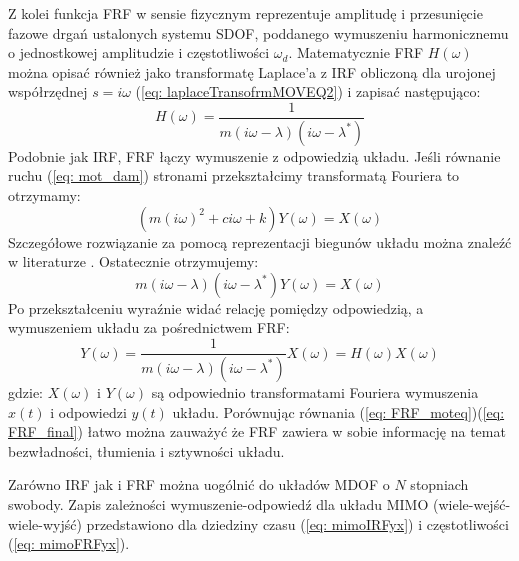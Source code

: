 Z kolei funkcja FRF w sensie fizycznym reprezentuje amplitudę i przesunięcie fazowe drgań ustalonych systemu SDOF, poddanego wymuszeniu harmonicznemu o jednostkowej amplitudzie i częstotliwości $\omega_d$. Matematycznie FRF $H(\omega)$ można opisać również jako transformatę Laplace'a z IRF obliczoną dla urojonej współrzędnej $s=i\omega$ (\ref{eq: laplaceTransofrmMOVEQ2}) i zapisać następująco:
\begin{equation} \label{eq: FRFfunction}
	H(\omega)=\frac{1}{m(i\omega-\lambda)(i\omega-\lambda^*)}
\end{equation}
Podobnie jak IRF, FRF łączy wymuszenie z odpowiedzią układu. Jeśli równanie ruchu (\ref{eq: mot_dam}) stronami przekształcimy transformatą Fouriera to otrzymamy:
\begin{equation} \label{eq: FRF_moteq}
	(m(i\omega)^2+ci\omega + k)Y(\omega)=X(\omega)
\end{equation}
Szczegółowe rozwiązanie za pomocą reprezentacji biegunów układu można znaleźć w literaturze \parencite{Brincker2015}. Ostatecznie otrzymujemy:
\begin{equation} 
	m(i\omega-\lambda)(i\omega-\lambda^*)Y(\omega)=X(\omega)
\end{equation}
Po przekształceniu wyraźnie widać relację pomiędzy odpowiedzią, a wymuszeniem układu za pośrednictwem FRF:
\begin{equation} \label{eq: FRF_final}
	Y(\omega)=\frac{1}{m(i\omega-\lambda)(i\omega-\lambda^*)}X(\omega)=H(\omega)X(\omega)
\end{equation}
gdzie: $X(\omega)$ i $Y(\omega)$ są odpowiednio transformatami Fouriera wymuszenia $x(t)$ i odpowiedzi $y(t)$ układu. Porównując równania (\ref{eq: FRF_moteq})(\ref{eq: FRF_final}) łatwo można zauważyć że FRF zawiera w sobie informację na temat bezwładności, tłumienia i sztywności układu.




Zarówno IRF jak i FRF można uogólnić do układów MDOF o $N$ stopniach swobody. Zapis zależności wymuszenie-odpowiedź dla układu MIMO (wiele-wejść-wiele-wyjść) przedstawiono dla dziedziny czasu (\ref{eq: mimoIRFyx}) i częstotliwości (\ref{eq: mimoFRFyx}).

